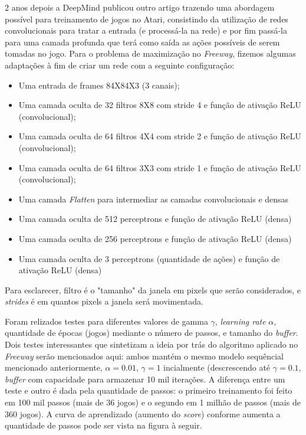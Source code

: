 \documentclass[letterpaper]{article} %
\begin{document}
2 anos depois a DeepMind publicou outro artigo trazendo uma abordagem possível para treinamento de jogos no Atari, consistindo da utilização de redes convolucionais para tratar a entrada (e processá-la na rede) e por fim passá-la para uma camada profunda que terá como saída as ações possíveis de serem tomadas no jogo. Para o problema de maximização no \textit{Freeway}, fizemos algumas adaptações à fim de criar um rede com a seguinte configuração: 

\begin{itemize}
	\item Uma entrada de frames 84X84X3 (3 canais);
	\item Uma camada oculta de 32 filtros 8X8 com stride 4 e função de ativação ReLU (convolucional);
	\item Uma camada oculta de 64 filtros 4X4 com stride 2 e função de ativação ReLU (convolucional);
	\item Uma camada oculta de 64 filtros 3X3 com stride 1 e função de ativação ReLU (convolucional);
	\item Uma camada \textit{Flatten} para intermediar as camadas convolucionais e densas
	\item Uma camada oculta de 512 perceptrons e função de ativação ReLU (densa)
	\item Uma camada oculta de 256 perceptrons e função de ativação ReLU (densa)
	\item Uma camada oculta de 3 perceptrons (quantidade de ações) e função de ativação ReLU (densa)
\end{itemize}

Para esclarecer, filtro é o "tamanho" da janela em pixels que serão considerados, e \textit{strides} é em quantos pixels a janela será movimentada.

Foram relizados testes para diferentes valores de gamma $\gamma$, \textit{learning rate} $\alpha$, quantidade de épocas (jogos) mediante o número de passos, e tamanho do \textit{buffer}. Dois testes interessantes que sintetizam a ideia por trás do algoritmo aplicado no \textit{Freeway} serão mencionados aqui: ambos mantém o mesmo modelo sequêncial mencionado anteriormente, $\alpha = 0.01$, $\gamma = 1$ incialmente (descrescendo até $\gamma = 0.1$, \textit{buffer} com capacidade para armazenar 10 mil iterações. A diferença entre um teste e outro é dada pela quantidade de passos: o primeiro treinamento foi feito em 100 mil passos (mais de 36 jogos) e o segundo em 1 milhão de passos (mais de 360 jogos). A curva de aprendizado (aumento do \textit{score}) conforme aumenta a quantidade de passos pode ser vista na figura à seguir.
\end{document}
